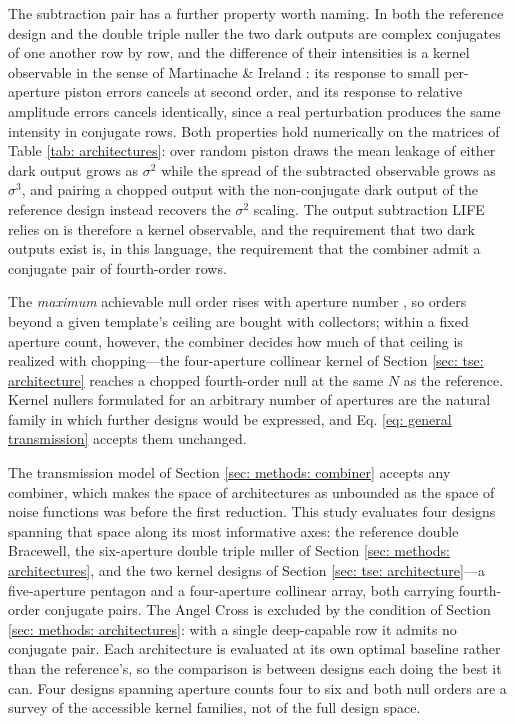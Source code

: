 \documentclass[12pt,a4paper]{article}
\numberwithin{equation}{section}
\numberwithin{figure}{section}
\numberwithin{table}{section}
\begin{document}
The subtraction pair has a further property worth naming. In both the reference design and the double triple nuller the two dark outputs are complex conjugates of one another row by row, and the difference of their intensities is a kernel observable in the sense of Martinache \& Ireland \cite{martinache2018kernel}: its response to small per-aperture piston errors cancels at second order, and its response to relative amplitude errors cancels identically, since a real perturbation produces the same intensity in conjugate rows. Both properties hold numerically on the matrices of Table \ref{tab: architectures}: over random piston draws the mean leakage of either dark output grows as $\sigma^{2}$ while the spread of the subtracted observable grows as $\sigma^{3}$, and pairing a chopped output with the non-conjugate dark output of the reference design instead recovers the $\sigma^{2}$ scaling. The output subtraction LIFE relies on is therefore a kernel observable, and the requirement that two dark outputs exist is, in this language, the requirement that the combiner admit a conjugate pair of fourth-order rows.

The \emph{maximum} achievable null order rises with aperture number \cite{guyon2013beam}, so orders beyond a given template's ceiling are bought with collectors; within a fixed aperture count, however, the combiner decides how much of that ceiling is realized with chopping---the four-aperture collinear kernel of Section \ref{sec: tse: architecture} reaches a chopped fourth-order null at the same $N$ as the reference. Kernel nullers formulated for an arbitrary number of apertures \cite{laugier2020kernel} are the natural family in which further designs would be expressed, and Eq. \ref{eq: general transmission} accepts them unchanged.

The transmission model of Section \ref{sec: methods: combiner} accepts any combiner, which makes the space of architectures as unbounded as the space of noise functions was before the first reduction. This study evaluates four designs spanning that space along its most informative axes: the reference double Bracewell, the six-aperture double triple nuller of Section \ref{sec: methods: architectures}, and the two kernel designs of Section \ref{sec: tse: architecture}---a five-aperture pentagon and a four-aperture collinear array, both carrying fourth-order conjugate pairs. The Angel Cross is excluded by the condition of Section \ref{sec: methods: architectures}: with a single deep-capable row it admits no conjugate pair. Each architecture is evaluated at its own optimal baseline rather than the reference's, so the comparison is between designs each doing the best it can. Four designs spanning aperture counts four to six and both null orders are a survey of the accessible kernel families, not of the full design space.
\end{document}
